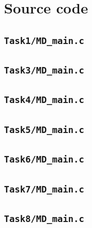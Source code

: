 \vfill


\newpage
\appendix
\section{Source code}

\subsection{\texttt{Task1/MD\_main.c}}


\subsection{\texttt{Task3/MD\_main.c}}


\subsection{\texttt{Task4/MD\_main.c}}


\subsection{\texttt{Task5/MD\_main.c}}


\subsection{\texttt{Task6/MD\_main.c}}


\subsection{\texttt{Task7/MD\_main.c}}



\subsection{\texttt{Task8/MD\_main.c}}






